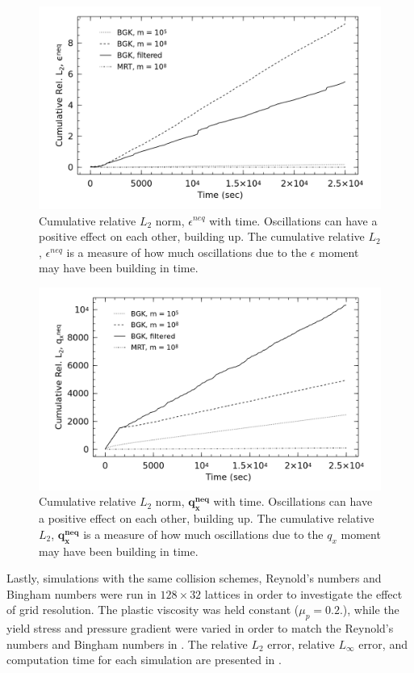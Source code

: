 \begin{figure}
    \includegraphics[width=\linewidth]{figs/poise-bingham/epsilon_cumulative}
    \caption{Cumulative relative $L_2$ norm, $\epsilon^{neq}$ with time. Oscillations can have a positive effect on each other, building up. The cumulative relative $L_2$, $\epsilon^{neq}$ is a measure of how much oscillations due to the $\epsilon$ moment may have been building in time.}
    \label{fig:epsilon-cumulative}
\end{figure}

\begin{figure}
    \includegraphics[width=\linewidth]{figs/poise-bingham/qx_cumulative}
    \caption{Cumulative relative $L_2$ norm, $\mathbf{q_x^{neq}}$ with time. Oscillations can have a positive effect on each other, building up. The cumulative relative $L_2$, $\mathbf{q_x^{neq}}$ is a measure of how much oscillations due to the $q_x$ moment may have been building in time.}
    \label{fig:qx-cumulative}
\end{figure}

Lastly, simulations with the same collision schemes, Reynold's numbers and Bingham numbers were run in $128 \times 32$ lattices in order to investigate the effect of grid resolution.
The plastic viscosity was held constant ($\mu_p = 0.2$.), while the yield stress and pressure gradient were varied in order to match the Reynold's numbers and Bingham numbers in .
The relative $L_2$ error, relative $L_{\infty}$ error, and computation time for each simulation are presented in . 

